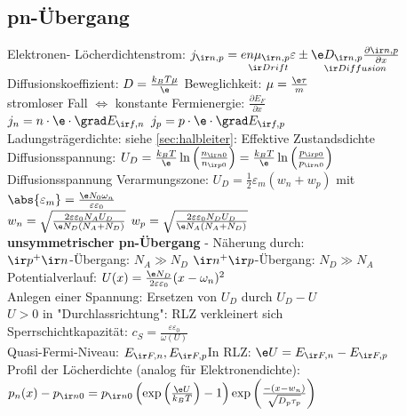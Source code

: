 \documentclass[fs, footer]{latex4ei}
\begin{document}
\begin{multicols*}{4}
\section{pn-Übergang}
Elektronen- Löcherdichtenstrom: $j_{\ir n,p} = \underset{\ir Drift}{en\mu_{\ir n,p}\varepsilon} \pm \underset{\ir Diffusion}{\e D_{\ir n,p} \frac{\partial {\ir n,p}}{\partial x}}$\\
Diffusionskoeffizient: $D = \frac{k_BT\mu}{\e}$ \qquad Beweglichkeit: $\mu=\frac{\e\tau}{m}$\\
stromloser Fall $\Leftrightarrow$ konstante Fermienergie: $\frac{\partial E_F}{\partial x}$\\
$j_n = n\cdot\e\cdot\grad E_{\ir f,n}$ \qquad $j_p = p\cdot\e\cdot\grad E_{\ir f,p}$\\
Ladungsträgerdichte: siehe \ref{sec:halbleiter}: Effektive Zustandsdichte\\
Diffusionsspannung: $U_D = \frac{k_BT}{\e}\ln\left(\frac{n_{\ir n0}}{n_{\ir p0}}\right)=\frac{k_BT}{\e}\ln\left(\frac{p_{\ir p0}}{p_{\ir n0}}\right)$\\
Diffusionsspannung Verarmungszone: $U_D = \frac{1}{2}\varepsilon_m(w_n + w_p)$ mit $\abs{\varepsilon_m} = \frac{\e N_0\omega_n}{\varepsilon\varepsilon_0}$\\
$w_n = \sqrt{\frac{2\varepsilon\varepsilon_0N_AU_D}{\e N_D(N_A+N_D)}}$ \qquad $w_p = \sqrt{\frac{2\varepsilon\varepsilon_0N_DU_D}{\e N_A(N_A+N_D)}}$\\
\textbf{unsymmetrischer pn-Übergang} - Näherung durch:\\
$\ir p^+\ir n$-Übergang: $N_A \gg N_D$ \qquad $\ir n^+\ir p$-Übergang: $N_D \gg N_A$\\
Potentialverlauf: $U(x) = \frac{\e N_D}{2\varepsilon\varepsilon_0}(x-\omega_n)^2$\\
Anlegen einer Spannung: Ersetzen von $U_D$ durch $U_D-U$\\
$U > 0$ in "Durchlassrichtung": RLZ verkleinert sich\\
Sperrschichtkapazität: $c_S = \frac{\varepsilon\varepsilon_0}{\omega(U)}$\\
Quasi-Fermi-Niveau: $E_{\ir F,n}, E_{\ir F,p}$\qquad In RLZ: $\e U = E_{\ir F,n} - E_{\ir F,p}$\\
Profil der Löcherdichte (analog für Elektronendichte):\\ $p_n(x) - p_{\ir n0} = p_{\ir n0}\left(\exp\left(\frac{\e U}{k_BT}\right)-1\right)\exp\left(\frac{-(x-w_n)}{\sqrt{D_p\tau_p}}\right)$\\

\end{multicols*}
\end{document}
